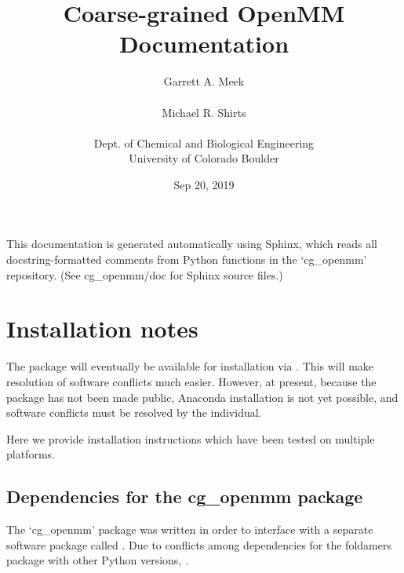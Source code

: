 \documentclass[letterpaper,12pt,english,openany,oneside]{sphinxmanual}
\title{Coarse-grained OpenMM Documentation}
\date{Sep 20, 2019}
\author{Garrett A. Meek\\ \\Michael R. Shirts\\ \\Dept. of Chemical and Biological Engineering\\University of Colorado Boulder}
\begin{document}
\pagestyle{empty}
\sphinxmaketitle
\pagestyle{plain}
\sphinxtableofcontents
\pagestyle{normal}
\label{\detokenize{index::doc}}


This documentation is generated automatically using Sphinx, which reads all docstring-formatted comments from Python functions in the ‘cg\_openmm’ repository.  (See cg\_openmm/doc for Sphinx source files.)


\chapter{Installation notes}
\label{\detokenize{install:installation-notes}}\label{\detokenize{install::doc}}
The  package will eventually be available for installation via .  This will make resolution of software conflicts much easier.  However, at present, because the package has not been made public, Anaconda installation is not yet possible, and software conflicts must be resolved by the individual.

Here we provide installation instructions which have been tested on multiple platforms.


\section{Dependencies for the cg\_openmm package}
\label{\detokenize{install:dependencies-for-the-cg-openmm-package}}
The ‘cg\_openmm’ package was written in order to interface with a separate software package called .  Due to conflicts among dependencies for the foldamers package with other Python versions, .
\end{document}
